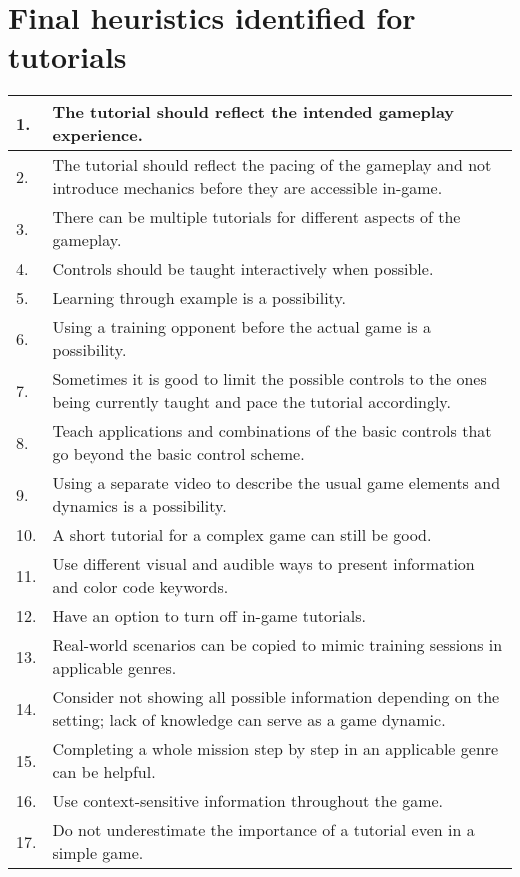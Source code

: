 \chapter{Final heuristics identified for tutorials}

\begin{center}
	\begin{tabularx}{\textwidth}{|l|X|}
		\hline
		1. & The tutorial should reflect the intended gameplay experience. \\ \hline
		2. & The tutorial should reflect the pacing of the gameplay and not introduce mechanics before they are accessible in-game. \\ \hline
		3. & There can be multiple tutorials for different aspects of the gameplay. \\ \hline
		4. & Controls should be taught interactively when possible. \\ \hline
		5. & Learning through example is a possibility. \\ \hline
		6. & Using a training opponent before the actual game is a possibility. \\ \hline
		7. & Sometimes it is good to limit the possible controls to the ones being currently taught and pace the tutorial accordingly. \\ \hline
		8. & Teach applications and combinations of the basic controls that go beyond the basic control scheme. \\ \hline
		9. & Using a separate video to describe the usual game elements and dynamics is a possibility. \\ \hline
		10. & A short tutorial for a complex game can still be good. \\ \hline
		11. & Use different visual and audible ways to present information and color code keywords. \\ \hline
		12. & Have an option to turn off in-game tutorials. \\ \hline
		13. & Real-world scenarios can be copied to mimic training sessions in applicable genres. \\ \hline
		14. & Consider not showing all possible information depending on the setting; lack of knowledge can serve as a game dynamic. \\ \hline
		15. & Completing a whole mission step by step in an applicable genre can be helpful. \\ \hline
		16. & Use context-sensitive information throughout the game. \\ \hline
		17. & Do not underestimate the importance of a tutorial even in a simple game. \\ \hline

\end{tabularx}
\end{center}
